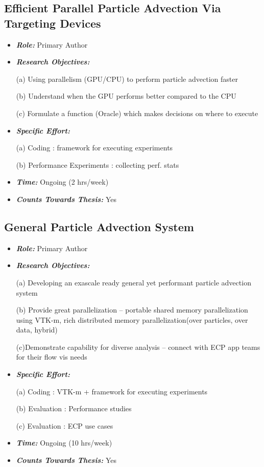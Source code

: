 \documentclass{article}
\newcommand{\boit}[1]{\textbf{\textit{#1}}}
\begin{document}
\subsection{Efficient Parallel Particle Advection Via Targeting Devices}
\begin{itemize}
\item \boit{Role:} Primary Author
\item \boit{Research Objectives:}

(a) Using parallelism (GPU/CPU) to perform particle advection faster

(b) Understand when the GPU performs better compared to the CPU

(c) Formulate a function (Oracle) which makes decisions on where to execute
\item \boit{Specific Effort:}

(a) Coding : framework for executing experiments

(b) Performance Experiments : collecting perf. stats
\item \boit{Time:}
Ongoing (2 hrs/week)
\item \boit{Counts Towards Thesis:} Yes
\end{itemize}

\subsection{General Particle Advection System}
\begin{itemize}
\item \boit{Role:} Primary Author
\item \boit{Research Objectives:}

(a) Developing an exascale ready general yet performant particle advection system

(b) Provide great parallelization -- portable shared memory parallelization using VTK-m,
rich distributed memory parallelization(over particles, over data, hybrid)

(c)Demonstrate capability for diverse analysis -- connect with ECP app teams for their flow vis needs
\item \boit{Specific Effort:}

(a) Coding : VTK-m + framework for executing experiments

(b) Evaluation : Performance studies

(c) Evaluation : ECP use cases
\item \boit{Time:}
Ongoing (10 hrs/week)
\item \boit{Counts Towards Thesis:} Yes
\end{itemize}
\end{document}
